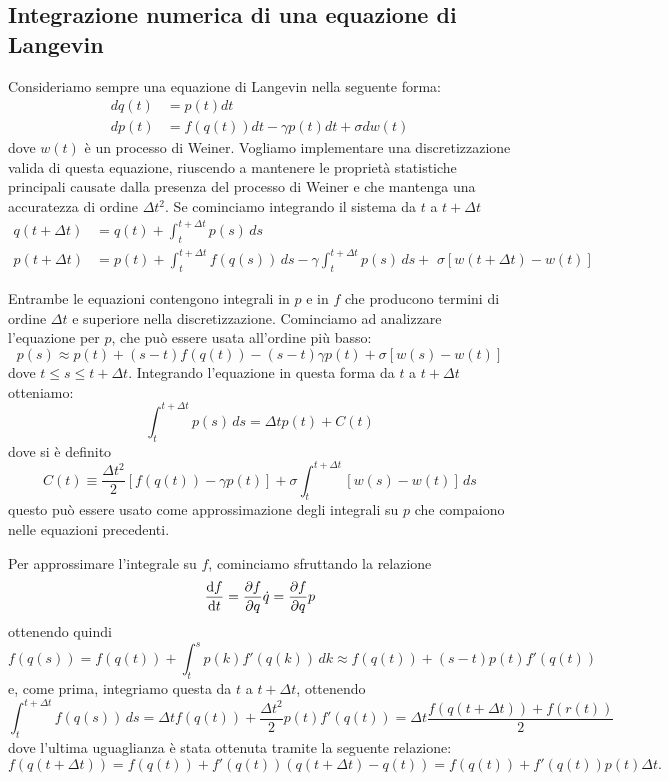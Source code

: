 \documentclass[10pt,a4paper]{article}
\begin{document}
\subsection{Integrazione numerica di una equazione di Langevin}
\label{sec:integratore}
Consideriamo sempre una equazione di Langevin nella seguente forma:
\begin{align}
	dq(t) &= p(t)dt \\
	dp(t) &= f(q(t))dt - \gamma p(t)dt + \sigma dw(t)
\end{align}
dove $w(t)$ è un processo di Weiner. Vogliamo implementare una discretizzazione valida di questa equazione, riuscendo a mantenere le proprietà statistiche principali causate dalla presenza del processo di Weiner e che mantenga una accuratezza di ordine $\Delta t^2$. Se cominciamo integrando il sistema da $t$ a $t + \Delta t$
\begin{align}
	q(t+\Delta t) &= q(t) + \int_t^{t+\Delta t} p(s)\,ds\\
	p(t+\Delta t) &= p(t) + \int_t^{t+\Delta t} f(q(s))\,ds -\gamma \int_t^{t+\Delta t} p(s)\,ds + \,\, \sigma[w(t+\Delta t)-w(t)]
\end{align}

Entrambe le equazioni contengono integrali in $p$ e in $f$ che producono termini di ordine $\Delta t$ e superiore nella discretizzazione. Cominciamo ad analizzare l'equazione per $p$, che può essere usata all'ordine più basso:
\begin{equation}
	p(s) \approx p(t) + (s-t)f(q(t)) -(s-t)\gamma p(t) + \sigma[w(s)-w(t)]
\end{equation}
dove $t\leq s\leq t+\Delta t$. Integrando l'equazione in questa forma da $t$ a $t+\Delta t$ otteniamo:
\begin{equation}
	\int_t^{t+\Delta t} p(s)\,ds = \Delta t p(t) + C(t)
\end{equation}
dove si è definito
\begin{equation}
	C(t) \equiv \frac{\Delta t^2}{2}[f(q(t))-\gamma p(t)] + \sigma \int_t^{t+\Delta t}[w(s)-w(t)]\,ds
	\label{eq:c_t}
\end{equation}
questo può essere usato come approssimazione degli integrali su $p$ che compaiono nelle equazioni precedenti.

Per approssimare l'integrale su $f$, cominciamo sfruttando la relazione
\begin{equation}
	\dv{f}{t} = \pdv{f}{q} \dot{q} = \pdv{f}{q} p
\end{equation}
ottenendo quindi
\begin{equation}
	f(q(s)) = f(q(t))+\int_t^s p(k)f'(q(k))\,dk \approx f(q(t))+(s-t)p(t)f'(q(t))
\end{equation}
e, come prima, integriamo questa da $t$ a $t+\Delta t$, ottenendo
\begin{equation}
	\int_t^{t+\Delta t} f(q(s))\,ds = \Delta t f(q(t)) + \frac{\Delta t^2}{2}p(t)f'(q(t)) = \Delta t \frac{f(q(t+\Delta t))+ f(r(t))}{2}
\end{equation}
dove l'ultima uguaglianza è stata ottenuta tramite la seguente relazione:
\begin{equation}
	f(q(t+\Delta t)) = f(q(t)) + f'(q(t))(q(t+\Delta t)-q(t)) = f(q(t)) + f'(q(t))p(t)\Delta t.
\end{equation}
\end{document}

